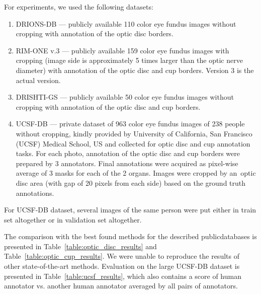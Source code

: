 \documentclass{llncs}
\begin{document}
For experiments, we used the following datasets:
\begin{enumerate}
\item DRIONS-DB \cite{drionsdb} --- publicly available 110 color eye fundus images without cropping with annotation of the optic disc borders.
\item RIM-ONE v.3 \cite{rimone} --- publicly available 159 color eye fundus images with cropping (image side is approximately 5 times larger than the optic nerve diameter) with annotation of the optic disc and cup borders. Version 3 is the actual version.
\item DRISHTI-GS \cite{drishtigs1,drishtigs2} --- publicly available 50 color eye fundus images without cropping with annotation of the optic disc and cup borders. 
\item UCSF-DB --- private dataset of 963 color eye fundus images of 238 people without cropping, kindly provided by University of California, San Francisco (UCSF) Medical School, US and collected for optic disc and cup annotation tasks. For each photo, annotation of the optic disc and cup borders were prepared by 3 annotators. Final annotations were acquired as pixel-wise average of 3 masks for each of the 2 organs. Images were cropped by an~optic disc area (with gap of 20 pixels from each side) based on the ground truth annotations.
\end{enumerate}

For UCSF-DB dataset, several images of the same person were put either in train set altogether or in validation set altogether.

The comparison with the best found methods for the described public\linebreak databases is presented in Table~\ref{table:optic_disc_results} and Table~\ref{table:optic_cup_results}. We were unable to reproduce the results of other state-of-the-art methods. Evaluation on the large UCSF-DB dataset is presented in Table~\ref{table:ucsf_results}, which also contains a score of human annotator vs. another human annotator averaged by all pairs of annotators.
\end{document}
